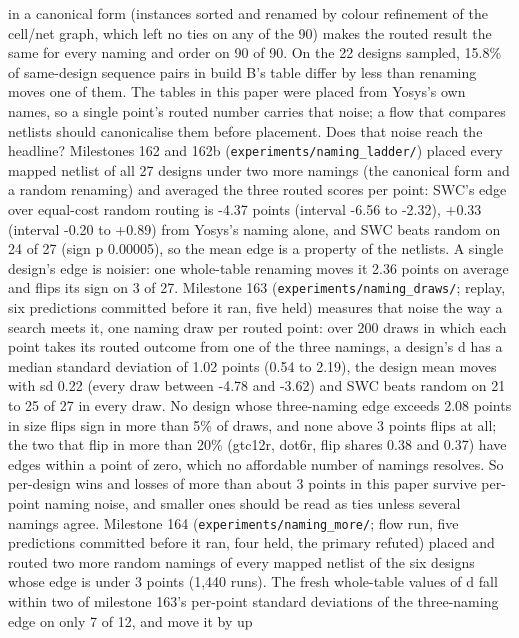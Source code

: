 \documentclass[conference]{IEEEtran}
\begin{document}
in a canonical form (instances sorted and renamed by colour refinement
of the cell/net graph, which left no ties on any of the 90) makes the
routed result the same for every naming and order on 90 of 90. On the 22
designs sampled, 15.8\% of same-design sequence pairs in build B's table
differ by less than renaming moves one of them. The tables in this paper
were placed from Yosys's own names, so a single point's routed number
carries that noise; a flow that compares netlists should canonicalise
them before placement. Does that noise reach the headline? Milestones
162 and 162b (\texttt{experiments/\allowbreak{}naming\_\allowbreak{}ladder/\allowbreak{}}) placed every mapped
netlist of all 27 designs under two more namings (the canonical form and
a random renaming) and averaged the three routed scores per point: SWC's
edge over equal-cost random routing is -4.37 points (interval -6.56 to
-2.32), +0.33 (interval -0.20 to +0.89) from Yosys's naming alone, and
SWC beats random on 24 of 27 (sign p 0.00005), so the mean edge is a
property of the netlists. A single design's edge is noisier: one
whole-table renaming moves it 2.36 points on average and flips its sign
on 3 of 27. Milestone 163 (\texttt{experiments/\allowbreak{}naming\_\allowbreak{}draws/\allowbreak{}}; replay,
six predictions committed before it ran, five held) measures that noise
the way a search meets it, one naming draw per routed point: over 200
draws in which each point takes its routed outcome from one of the three
namings, a design's d has a median standard deviation of 1.02 points
(0.54 to 2.19), the design mean moves with sd 0.22 (every draw between
-4.78 and -3.62) and SWC beats random on 21 to 25 of 27 in every draw.
No design whose three-naming edge exceeds 2.08 points in size flips sign
in more than 5\% of draws, and none above 3 points flips at all; the two
that flip in more than 20\% (gtc12r, dot6r, flip shares 0.38 and 0.37)
have edges within a point of zero, which no affordable number of namings
resolves. So per-design wins and losses of more than about 3 points in
this paper survive per-point naming noise, and smaller ones should be
read as ties unless several namings agree. Milestone 164
(\texttt{experiments/\allowbreak{}naming\_\allowbreak{}more/\allowbreak{}}; flow run, five predictions
committed before it ran, four held, the primary refuted) placed and
routed two more random namings of every mapped netlist of the six
designs whose edge is under 3 points (1,440 runs). The fresh whole-table
values of d fall within two of milestone 163's per-point standard
deviations of the three-naming edge on only 7 of 12, and move it by up
\end{document}
